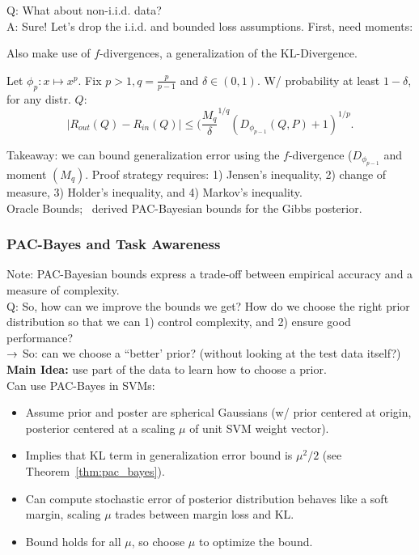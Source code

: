 Q: What about non-i.i.d. data? \\

A: Sure! Let's drop the i.i.d. and bounded loss assumptions. First, need moments:

Also make use of $f$-divergences, a generalization of the KL-Divergence. \\

\begin{theorem}
Let $\phi_p : x \mapsto x^p$. Fix $p > 1, q = \frac{p}{p-1}$ and $\delta \in (0,1)$. W/ probability at least $1-\delta$, for any distr. $Q$:
\[
|R_{out}(Q) - R_{in}(Q)| \leq (\frac{M_q}{\delta}^{1/q}(D_{\phi_{p-1}}(Q,P) + 1)^{1/p}.
\]
\end{theorem}

Takeaway: we can bound generalization error using the $f$-divergence ($D_{\phi_{p-1}}$ and moment $(M_q)$. Proof strategy requires: 1) Jensen's inequality, 2) change of measure, 3) Holder's inequality, and 4) Markov's inequality. \\

Oracle Bounds;~\citet{catoni2007pac} derived PAC-Bayesian bounds for the Gibbs posterior.

\subsubsection{PAC-Bayes and Task Awareness}

Note: PAC-Bayesian bounds express a trade-off between empirical accuracy and a measure of complexity. \\

Q: So, how can we improve the bounds we get? How do we choose the right prior distribution so that we can 1) control complexity, and 2) ensure good performance? \\

$\rightarrow$ So: can we choose a ``better' prior? (without looking at the test data itself?) \\

{\bf Main Idea:} use part of the data to learn how to choose a prior. \\

Can use PAC-Bayes in SVMs:
\begin{itemize}
    \item Assume prior and poster are spherical Gaussians (w/ prior centered at origin, posterior centered at a scaling $\mu$ of unit SVM weight vector).
    \item Implies that KL term in generalization error bound is $\mu^2 / 2$ (see Theorem~\ref{thm:pac_bayes}).
    \item Can compute stochastic error of posterior distribution behaves like a soft margin, scaling $\mu$ trades between margin loss and KL.
    \item Bound holds for all $\mu$, so choose $\mu$ to optimize the bound.
\end{itemize}

